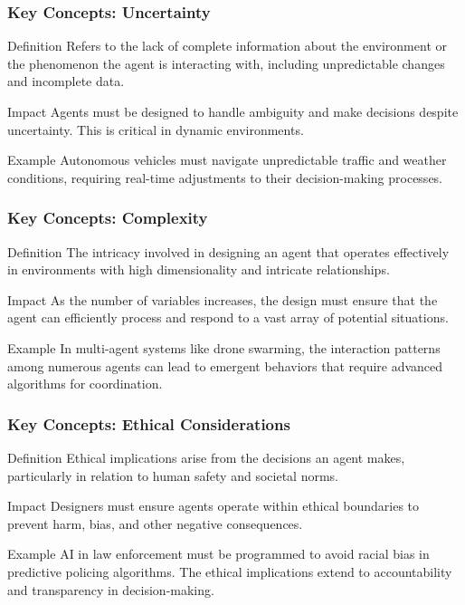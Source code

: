 \documentclass[aspectratio=169]{beamer}
\begin{document}
\begin{frame}[fragile]
    \frametitle{Key Concepts: Uncertainty}
    \begin{block}{Definition}
        Refers to the lack of complete information about the environment or the phenomenon the agent is interacting with, including unpredictable changes and incomplete data.
    \end{block}
    \begin{block}{Impact}
        Agents must be designed to handle ambiguity and make decisions despite uncertainty. This is critical in dynamic environments.
    \end{block}
    \begin{block}{Example}
        Autonomous vehicles must navigate unpredictable traffic and weather conditions, requiring real-time adjustments to their decision-making processes.
    \end{block}
\end{frame}

\begin{frame}[fragile]
    \frametitle{Key Concepts: Complexity}
    \begin{block}{Definition}
        The intricacy involved in designing an agent that operates effectively in environments with high dimensionality and intricate relationships.
    \end{block}
    \begin{block}{Impact}
        As the number of variables increases, the design must ensure that the agent can efficiently process and respond to a vast array of potential situations.
    \end{block}
    \begin{block}{Example}
        In multi-agent systems like drone swarming, the interaction patterns among numerous agents can lead to emergent behaviors that require advanced algorithms for coordination.
    \end{block}
\end{frame}

\begin{frame}[fragile]
    \frametitle{Key Concepts: Ethical Considerations}
    \begin{block}{Definition}
        Ethical implications arise from the decisions an agent makes, particularly in relation to human safety and societal norms.
    \end{block}
    \begin{block}{Impact}
        Designers must ensure agents operate within ethical boundaries to prevent harm, bias, and other negative consequences.
    \end{block}
    \begin{block}{Example}
        AI in law enforcement must be programmed to avoid racial bias in predictive policing algorithms. The ethical implications extend to accountability and transparency in decision-making.
    \end{block}
\end{frame}
\end{document}
